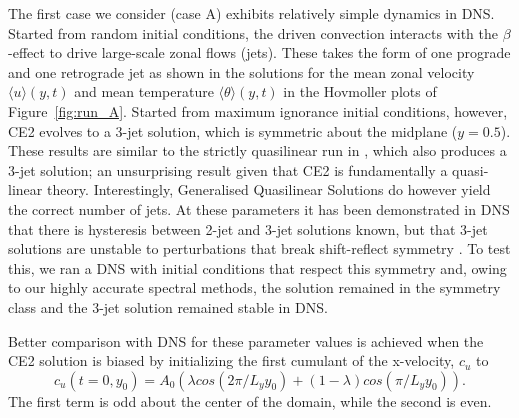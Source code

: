 \documentclass{jfm}
\newcommand{\cu}{c_u}
\begin{document}
The first case we consider (case A) exhibits relatively simple dynamics in DNS. Started from random initial conditions, the driven convection interacts with the $\beta$-effect to drive large-scale zonal flows (jets). These takes the form of one prograde and one retrograde jet as shown in the solutions for the mean zonal velocity $\langle u \rangle(y, t)$ and mean temperature $\langle \theta\rangle(y,t) $ in the Hovmoller plots of Figure~\ref{fig:run_A}. 
Started from maximum ignorance initial conditions, however, CE2 evolves to a 3-jet solution, which is symmetric about the midplane ($y=0.5$). These results are similar to the strictly quasilinear run in \citet{tom_2018}, which also produces a 3-jet solution; an unsurprising result given that 
 CE2 is fundamentally a quasi-linear theory. Interestingly, Generalised Quasilinear Solutions do however yield the correct number of jets. At these parameters it has been demonstrated in DNS that there is hysteresis between 2-jet and 3-jet solutions known, but that 3-jet solutions are unstable to perturbations that break shift-reflect symmetry \citep{bh1993}. To test this, we ran a DNS with initial conditions that respect this symmetry and, owing to our highly accurate spectral methods, the solution remained in the symmetry class and the 3-jet solution remained stable in DNS.

Better comparison with DNS for these parameter values is achieved when the CE2 solution is biased 
 by initializing the first cumulant of the x-velocity, $\cu$ to
\begin{equation}
  \label{eq:bias}
  \cu(t=0, y_0) = A_0 \left( \lambda cos(2\pi/L_y y_0) + (1-\lambda) cos (\pi/L_y y_0)\right).
\end{equation}
The first term is odd about the center of the domain, while the second is even.
\end{document}
